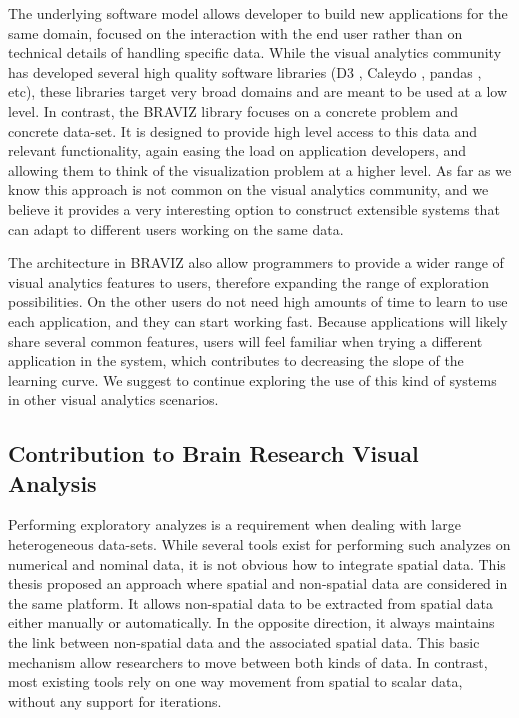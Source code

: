 {The underlying software model allows developer to build new applications for the same domain, focused on the interaction with the end user rather than on technical details of handling specific data. While the visual analytics community has developed several high quality software libraries (D3 \autocite{bostock_d3_2011}, Caleydo \autocite{lex_caleydo:_2010}, pandas \autocite{mckinney_data_2010}, etc), these libraries target very broad domains and are meant to be used at a low level. In contrast, the BRAVIZ library focuses on a concrete problem and concrete data-set. It is designed to provide high level access to this data and relevant functionality, again easing the load on application developers, and allowing them to think of the visualization problem at a higher level. As far as we know this approach is not common on the visual analytics community, and we believe it provides a very interesting option to construct extensible systems that can adapt to different users working on the same data. 

The architecture in BRAVIZ also allow programmers to provide a wider range of visual analytics features to users, therefore expanding the range of exploration possibilities. On the other users do not need high amounts of time to learn to use each application, and they can start working fast. Because applications will likely share several common features, users will feel familiar when trying a different application in the system, which contributes to decreasing the slope of the learning curve. We suggest to continue exploring the use of this kind of systems in other visual analytics scenarios.


\subsection{Contribution to Brain Research Visual Analysis }

Performing exploratory analyzes is a requirement when dealing with large heterogeneous data-sets. While several tools exist for performing such analyzes on numerical and nominal data, it is not obvious how to integrate spatial data. This thesis proposed an approach where spatial and non-spatial data are considered in the same platform. It allows non-spatial data to be extracted from spatial data either manually or automatically. In the opposite direction, it always maintains the link between non-spatial data and the associated spatial data. This basic mechanism allow researchers to move between both kinds of data. In contrast, most existing tools rely on one way movement from spatial to scalar data, without any support for iterations.

}
